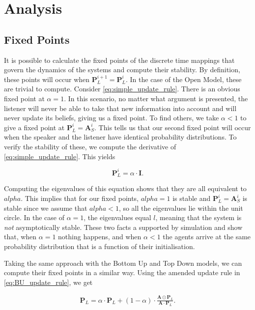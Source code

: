 \section{Analysis}

\subsection{Fixed Points}

It is possible to calculate the fixed points of the discrete time mappings that govern the dynamics of the systems and compute their stability. By definition, these points will occur when $\mathbf{P}^{i+1}_L = \mathbf{P}^{i}_L$. In the case of the Open Model, these are trivial to compute. Consider \cref{eq:simple_update_rule}. There is an obvious fixed point at $\alpha = 1$. In this scenario, no matter what argument is presented, the listener will never be able to take that new information into account and will never update its beliefs, giving us a fixed point. To find others, we take $\alpha < 1$ to give a fixed point at $\mathbf{P}^i_L = \mathbf{A}^i_S$. This tells us that our second fixed point will occur when the speaker and the listener have identical probability distributions. To verify the stability of these, we compute the derivative of \cref{eq:simple_update_rule}. This yields

\begin{equation}
    \mathbf{P}^i_L = \alpha \cdot \mathbf{I} .
\end{equation}

Computing the eigenvalues of this equation shows that they are all equivalent to $alpha$. This implies that for our fixed points, $alpha = 1$ is stable and $\mathbf{P}^i_L = \mathbf{A}^i_S$ is stable since we assume that $alpha < 1$, so all the eigenvalues lie within the unit circle. In the case of $\alpha = 1$, the eigenvalues equal $l$, meaning that the system is \emph{not} asymptotically stable. These two facts a supported by simulation and show that, when $\alpha = 1$ nothing happens, and when $\alpha < 1 $ the agents arrive at the same probability distribution that is a function of their initialisation. 

Taking the same approach with the Bottom Up and Top Down models, we can compute their fixed points in a similar way. Using the amended update rule in \cref{eq:BU_update_rule}, we get

\begin{align*}
    \mathbf{P}_L = \alpha \cdot \mathbf{P}_L + (1 - \alpha) \cdot \frac{\mathbf{A} \odot \mathbf{P}_L}{\mathbf{A} \cdot \mathbf{P}_L}.
\end{align*}

